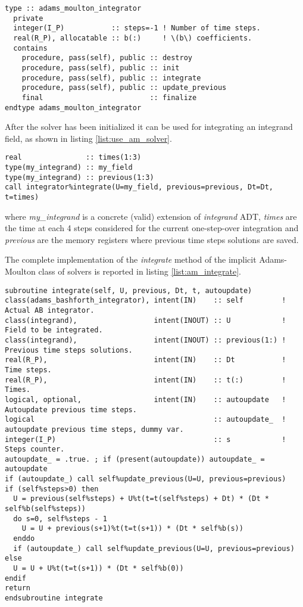 \documentclass[pdftex,preprint,3p,times,numbers]{elsarticle}
\begin{document}
\begin{lstlisting}[firstnumber=1,style=code,caption={definition of \emph{adams\_moulton\_integrator} type},label={list:am_solver}]
type :: adams_moulton_integrator
  private
  integer(I_P)           :: steps=-1 ! Number of time steps.
  real(R_P), allocatable :: b(:)     ! \(b\) coefficients.
  contains
    procedure, pass(self), public :: destroy
    procedure, pass(self), public :: init
    procedure, pass(self), public :: integrate
    procedure, pass(self), public :: update_previous
    final                         :: finalize
endtype adams_moulton_integrator
\end{lstlisting}

After the solver has been initialized it can be used for integrating an integrand field, as shown in listing \ref{list:use_am_solver}.

\begin{lstlisting}[firstnumber=1,style=code,caption={example of usage of an Adams-Moulton integrator},label={list:use_am_solver}]
real               :: times(1:3)
type(my_integrand) :: my_field
type(my_integrand) :: previous(1:3)
call integrator%integrate(U=my_field, previous=previous, Dt=Dt, t=times)
\end{lstlisting}
where \emph{my\_integrand} is a concrete (valid) extension of \emph{integrand} ADT, \emph{times} are the time at each 4 steps considered for the current one-step-over integration and \emph{previous} are the memory registers where previous time steps solutions are saved.

The complete implementation of the \emph{integrate} method of the implicit Adams-Moulton class of solvers is reported in listing \ref{list:am_integrate}.

\begin{lstlisting}[firstnumber=1,style=code,caption={implementation of the \emph{integrate} method of explicit Adams-Moulton class},label={list:am_integrate}]
subroutine integrate(self, U, previous, Dt, t, autoupdate)
class(adams_bashforth_integrator), intent(IN)    :: self         ! Actual AB integrator.
class(integrand),                  intent(INOUT) :: U            ! Field to be integrated.
class(integrand),                  intent(INOUT) :: previous(1:) ! Previous time steps solutions.
real(R_P),                         intent(IN)    :: Dt           ! Time steps.
real(R_P),                         intent(IN)    :: t(:)         ! Times.
logical, optional,                 intent(IN)    :: autoupdate   ! Autoupdate previous time steps.
logical                                          :: autoupdate_  ! autoupdate previous time steps, dummy var.
integer(I_P)                                     :: s            ! Steps counter.
autoupdate_ = .true. ; if (present(autoupdate)) autoupdate_ = autoupdate
if (autoupdate_) call self%update_previous(U=U, previous=previous)
if (self%steps>0) then
  U = previous(self%steps) + U%t(t=t(self%steps) + Dt) * (Dt * self%b(self%steps))
  do s=0, self%steps - 1
    U = U + previous(s+1)%t(t=t(s+1)) * (Dt * self%b(s))
  enddo
  if (autoupdate_) call self%update_previous(U=U, previous=previous)
else
  U = U + U%t(t=t(s+1)) * (Dt * self%b(0))
endif
return
endsubroutine integrate
\end{lstlisting}
\end{document}
